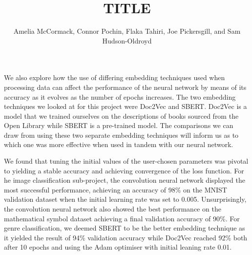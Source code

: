 \documentclass[twocolumn,pra,floatfix]{revtex4-2}
\begin{document}
\begin{titlepage}
\begin{center}
\begin{minipage}{0.92\textwidth}
                We also explore how the use of differing embedding techniques used when processing data can affect the performance of the neural network by means of its accuracy as it evolves as the number of epochs increases. The two embedding techniques we looked at for this project were Doc2Vec and SBERT. Doc2Vec is a model that we trained ourselves on the descriptions of  books sourced from the Open Library while SBERT is a pre-trained model. The comparisons we can draw from using these two separate embedding techniques will inform us as to which one was more effective when used in tandem with our neural network.

                We found that tuning the initial values of the user-chosen parameters was pivotal to yielding a stable accuracy and achieving convergence of the loss function. For he image classification sub-project, the convolution neural network displayed the most successful performance, achieving an accuracy of 98\% on the MNIST validation dataset when the initial learning rate was set to 0.005. Unsurprisingly, the convolution neural network also showed the best performance on the mathematical symbol dataset achieving a final validation accuracy of 90\%. For genre classification, we deemed SBERT to be the better embedding technique as it yielded the result of 94\% validation accuracy while Doc2Vec reached 92\% both after 10 epochs and using the Adam optimiser with initial leaning rate 0.01.


            \end{minipage}
        \end{center}
    \end{titlepage}


    \title{TITLE}
    \author{Amelia McCormack, Connor Pochin, Flaka Tahiri, Joe Pickersgill, and Sam Hudson-Oldroyd}

    \onecolumngrid
    \clearpage
    \tableofcontents
    \clearpage
    \twocolumngrid
\end{document}
